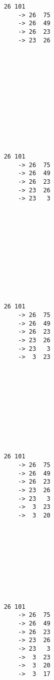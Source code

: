 { \begin{verbatim}
    26 101
        -> 26  75
        -> 26  49
        -> 26  23
        -> 23  26













        \end{verbatim}}
{ \begin{verbatim}
    26 101
        -> 26  75
        -> 26  49
        -> 26  23
        -> 23  26
        -> 23   3












        \end{verbatim}}
{ \begin{verbatim}
    26 101
        -> 26  75
        -> 26  49
        -> 26  23
        -> 23  26
        -> 23   3
        ->  3  23











        \end{verbatim}}
{ \begin{verbatim}
    26 101
        -> 26  75
        -> 26  49
        -> 26  23
        -> 23  26
        -> 23   3
        ->  3  23
        ->  3  20










        \end{verbatim}}
{ \begin{verbatim}
    26 101
        -> 26  75
        -> 26  49
        -> 26  23
        -> 23  26
        -> 23   3
        ->  3  23
        ->  3  20
        ->  3  17









        \end{verbatim}}
